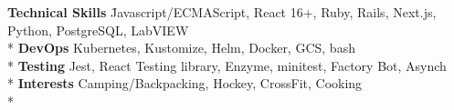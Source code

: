 
\newenvironment{nospacetabbing}{
    \begin{tabbing}
}{\end{tabbing}\vspace{-1.2em}}


\begin{cventries}

\begin{nospacetabbing}

  \textbf{Technical Skills}  \= Javascript/ECMAScript, React 16+, Ruby, Rails, Next.js, Python, PostgreSQL, LabVIEW\\*
  \textbf{DevOps} \> Kubernetes, Kustomize, Helm, Docker, GCS, bash\\*
  \textbf{Testing} \> Jest, React Testing library, Enzyme, minitest, Factory Bot, Asynch\\*
  \textbf{Interests} \> Camping/Backpacking, Hockey, CrossFit, Cooking\\*
  \end{nospacetabbing}
\end{cventries}
